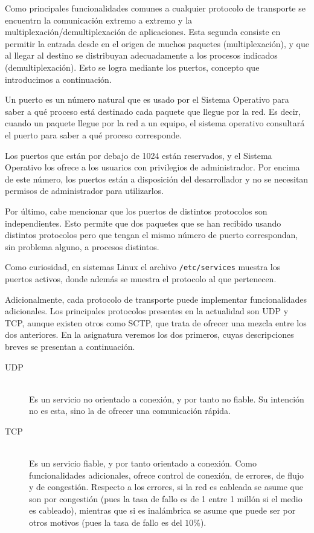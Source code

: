 Como principales funcionalidades comunes a cualquier protocolo de transporte se encuentrn la comunicación extremo a extremo y la multiplexación/demultiplexación de aplicaciones. Esta segunda consiste en permitir la entrada desde en el origen de muchos paquetes (multiplexación), y que al llegar al destino se distribuyan adecuadamente a los procesos indicados (demultiplexación). Esto se logra mediante los puertos, concepto que introducimos a continuación.
\begin{definicion}[Puertos]
    Un puerto es un número natural que es usado por el Sistema Operativo para saber a qué proceso está destinado cada paquete que llegue por la red. Es decir, cuando un paquete llegue por la red a un equipo, el sistema operativo consultará el puerto para saber a qué proceso corresponde.
\end{definicion}

Los puertos que están por debajo de 1024 están reservados, y el Sistema Operativo los ofrece a los usuarios con privilegios de administrador. Por encima de este número, los puertos están a disposición del desarrollador y no se necesitan permisos de administrador para utilizarlos.
    
Por último, cabe mencionar que los puertos de distintos protocolos son independientes. Esto permite que dos paquetes que se han recibido usando distintos protocolos pero que tengan el mismo número de puerto correspondan, sin problema alguno, a procesos distintos.
\begin{observacion}
    Como curiosidad, en sistemas Linux el archivo \verb|/etc/services| muestra los puertos activos, donde además se muestra el protocolo al que pertenecen.
\end{observacion}


Adicionalmente, cada protocolo de transporte puede implementar funcionalidades adicionales. Los principales protocolos presentes en la actualidad son \acrshort{UDP} y \acrshort{TCP}, aunque existen otros como \acrshort{SCTP}, que trata de ofrecer una mezcla entre los dos anteriores. En la asignatura veremos los dos primeros, cuyas descripciones breves se presentan a continuación.
\begin{description}
    \item [\acrshort{UDP}]~\\
        Es un servicio no orientado a conexión, y por tanto no fiable. Su intención no es esta, sino la de ofrecer una comunicación rápida.
    \item [\acrshort{TCP}]~\\
        Es un servicio fiable,  y por tanto orientado a conexión. Como funcionalidades adicionales, ofrece control de conexión, de errores, de flujo y de congestión. Respecto a los errores, si la red es cableada se asume que son por congestión (pues la tasa de fallo es de 1 entre 1 millón si el medio es cableado), mientras que si es inalámbrica se asume que puede ser por otros motivos (pues la tasa de fallo es del $10\%$).
\end{description}

